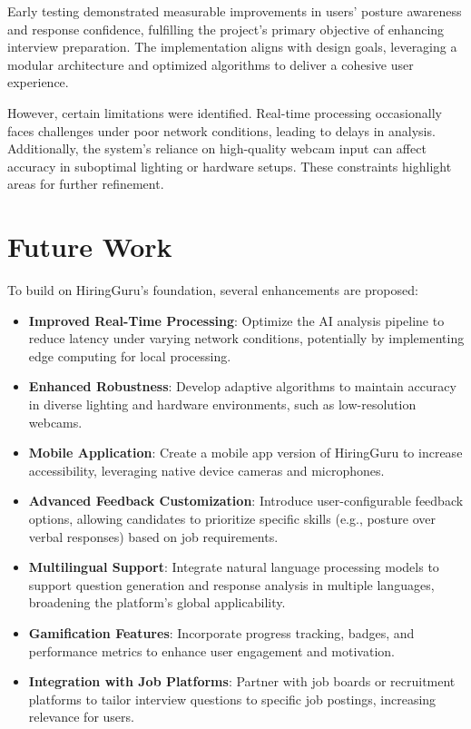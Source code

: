 Early testing demonstrated measurable improvements in users’ posture awareness and response confidence, fulfilling the project’s primary objective of enhancing interview preparation. The implementation aligns with design goals, leveraging a modular architecture and optimized algorithms to deliver a cohesive user experience.

However, certain limitations were identified. Real-time processing occasionally faces challenges under poor network conditions, leading to delays in analysis. Additionally, the system’s reliance on high-quality webcam input can affect accuracy in suboptimal lighting or hardware setups. These constraints highlight areas for further refinement.

\section{Future Work}
To build on HiringGuru’s foundation, several enhancements are proposed:
\begin{itemize}
    \item \textbf{Improved Real-Time Processing}: Optimize the AI analysis pipeline to reduce latency under varying network conditions, potentially by implementing edge computing for local processing.
    \item \textbf{Enhanced Robustness}: Develop adaptive algorithms to maintain accuracy in diverse lighting and hardware environments, such as low-resolution webcams.
    \item \textbf{Mobile Application}: Create a mobile app version of HiringGuru to increase accessibility, leveraging native device cameras and microphones.
    \item \textbf{Advanced Feedback Customization}: Introduce user-configurable feedback options, allowing candidates to prioritize specific skills (e.g., posture over verbal responses) based on job requirements.
    \item \textbf{Multilingual Support}: Integrate natural language processing models to support question generation and response analysis in multiple languages, broadening the platform’s global applicability.
    \item \textbf{Gamification Features}: Incorporate progress tracking, badges, and performance metrics to enhance user engagement and motivation.
    \item \textbf{Integration with Job Platforms}: Partner with job boards or recruitment platforms to tailor interview questions to specific job postings, increasing relevance for users.
\end{itemize}

